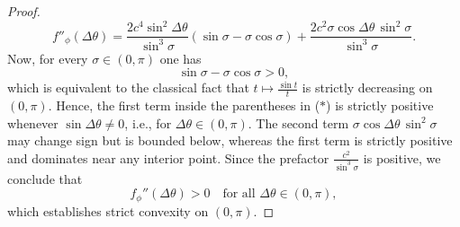 \documentclass[10pt,a4paper]{amsart}
\begin{document}
\begin{proof}
\begin{equation}
f''_\phi(\Delta\theta)
=
\frac{2c^{4}\sin^{2}\Delta\theta}{\sin^{3}\sigma}
(\sin\sigma - \sigma\cos\sigma)
+
\frac{2c^{2}\sigma\cos\Delta\theta\,\sin^{2}\sigma}{\sin^{3}\sigma}.
\tag{$\ast$}
\end{equation}
 Now, for every $\sigma \in (0,\pi)$ one has
\[
\sin\sigma - \sigma\cos\sigma > 0,
\]
which is equivalent to the classical fact that $t \mapsto \frac{\sin t}{t}$ is strictly decreasing on $(0,\pi)$.
Hence, the first term inside the parentheses in \textup{($\ast$)} is strictly positive whenever $\sin\Delta\theta \neq 0$, i.e., for $\Delta\theta \in (0,\pi)$.
The second term $\sigma\cos\Delta\theta\,\sin^{2}\sigma$ may change sign but is bounded below, whereas the first term is strictly positive and dominates near any interior point.
Since the prefactor $\frac{c^{2}}{\sin^{3}\sigma}$ is positive, we conclude that
\[
f_{\phi}''(\Delta\theta) > 0 \quad \text{for all } \Delta\theta \in (0,\pi),
\]
which establishes strict convexity on $(0,\pi)$.
\end{proof}
\end{document}
